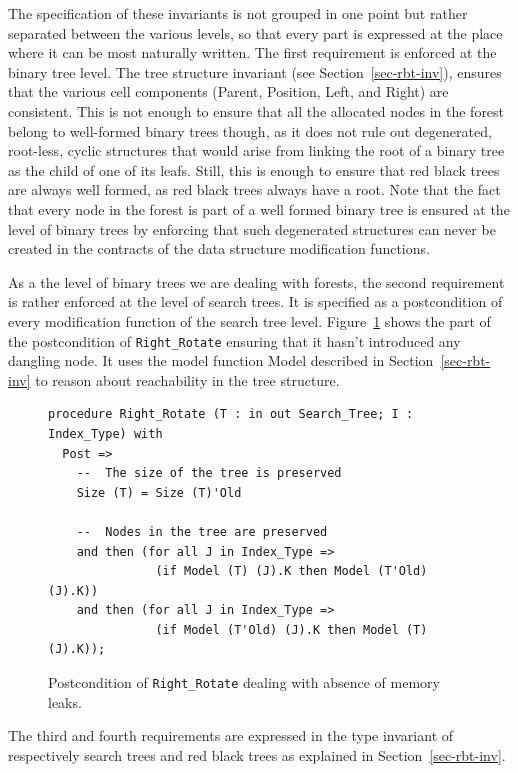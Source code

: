 \documentclass{llncs}
\begin{document}
The specification of these invariants is not grouped in one point but rather separated between the various levels,
so that every part is expressed at the place where it can be most naturally written. The first requirement is
enforced at the binary tree level. The tree structure invariant (see Section~\ref{sec-rbt-inv}),
ensures that the various cell components (Parent, Position, Left, and Right) are consistent. This is not enough
to ensure that all the allocated nodes in the forest belong to well-formed binary trees though, as it does
not rule out degenerated, root-less, cyclic structures that would arise from linking the root of a binary tree as the
child of one of its leafs. Still, this is enough to ensure that red black trees are always well formed, as red black
trees always have a root. Note that the fact that every node in the forest is part of
a well formed binary tree is ensured at the level of binary trees by enforcing that such degenerated structures can
never be created in the contracts of the data structure modification functions.

As a the level of binary trees we are dealing with forests, the second requirement is rather enforced at the level of
search trees. It is specified as a postcondition of every modification function of the search tree level.
Figure~\ref{fig-spec-no-leak} shows the part of the postcondition of \texttt{Right\_Rotate} ensuring that it hasn't introduced
any dangling node. It uses the model function Model described in Section~\ref{sec-rbt-inv} to reason about reachability
in the tree structure.

\begin{figure}[ht]
\begin{small}
\begin{lstlisting}
procedure Right_Rotate (T : in out Search_Tree; I : Index_Type) with
  Post =>
    --  The size of the tree is preserved
    Size (T) = Size (T)'Old

    --  Nodes in the tree are preserved
    and then (for all J in Index_Type =>
               (if Model (T) (J).K then Model (T'Old) (J).K))
    and then (for all J in Index_Type =>
               (if Model (T'Old) (J).K then Model (T) (J).K));
\end{lstlisting}
\end{small}
\caption{\label{fig-spec-no-leak} Postcondition of \texttt{Right\_Rotate} dealing with absence of memory leaks.}
\end{figure}

The third and fourth requirements are expressed in the type invariant of respectively search trees and red black trees
as explained in Section~\ref{sec-rbt-inv}.
\end{document}
